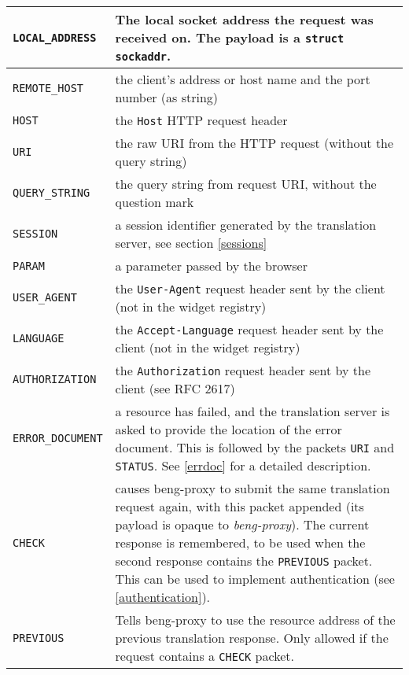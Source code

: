 \documentclass[a4paper,12pt]{article}
\begin{document}
\begin{longtable}{|l|p{10cm}|}
\hline

\verb|LOCAL_ADDRESS| & The local socket address the request was
received on.  The payload is a \texttt{struct sockaddr}. \\

\hline

\verb|REMOTE_HOST| & the client's address or host name and the port
number (as string) \\

\hline
\verb|HOST| & the \texttt{Host} HTTP request header \\
\hline
\verb|URI| & the raw URI from the HTTP request (without the query
string) \\
\hline

\verb|QUERY_STRING| & the query string from request URI, without
the question mark \\

\hline
\verb|SESSION| & a session identifier generated by the translation
server, see section \ref{sessions} \\
\hline
\verb|PARAM| & a parameter passed by the browser \\

\hline

\verb|USER_AGENT| & the \texttt{User-Agent} request header sent by
the client (not in the widget registry) \\

\hline

\verb|LANGUAGE| & the \texttt{Accept-Language} request header sent
by the client (not in the widget registry) \\

\hline

\verb|AUTHORIZATION| & the \texttt{Authorization} request header
sent by the client (see RFC 2617) \\

\hline

\verb|ERROR_DOCUMENT| & a resource has failed, and the translation
server is asked to provide the location of the error document.  This
is followed by the packets \verb|URI| and \verb|STATUS|.  See
\ref{errdoc} for a detailed description. \\

\hline

\verb|CHECK| & causes beng-proxy to submit the same translation
request again, with this packet appended (its payload is opaque to
\emph{beng-proxy}).  The current response is remembered, to be used
when the second response contains the \verb|PREVIOUS| packet.  This
can be used to implement authentication (see \ref{authentication}). \\

\hline

\verb|PREVIOUS| & Tells beng-proxy to use the resource address of
the previous translation response.  Only allowed if the request
contains a \verb|CHECK| packet. \\

\hline

\end{longtable}
\end{document}
